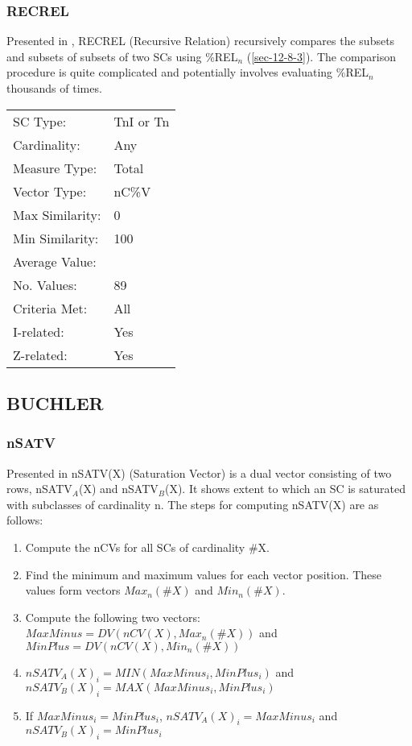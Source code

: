 \documentclass{article}
\begin{document}
\subsubsection{RECREL}
\label{sec-12-8-5}

Presented in \citet{Castren1994}, RECREL (Recursive Relation)
recursively compares the subsets and subsets of subsets of two SCs
using \%REL$_{n}$ (\ref{sec-12-8-3}). The comparison procedure is quite
complicated and potentially involves evaluating \%REL$_{n}$ thousands of
times.

\begin{center}
\begin{tabular}{ll}
 SC Type:         &  TnI or Tn  \\
 Cardinality:     &  Any        \\
 Measure Type:    &  Total      \\
 Vector Type:     &  nC\%V      \\
 Max Similarity:  &  0          \\
 Min Similarity:  &  100        \\
 Average Value:   &             \\
 No. Values:      &  89         \\
 Criteria Met:    &  All        \\
 I-related:       &  Yes        \\
 Z-related:       &  Yes        \\
\end{tabular}
\end{center}
\subsection{BUCHLER}
\label{sec-12-9}
\subsubsection{nSATV}
\label{sec-12-9-1}

Presented in \citet[chap. 2.3]{Buchler1997} nSATV(X) (Saturation
Vector) is a dual vector consisting of two rows, nSATV$_{A}$(X) and
nSATV$_{B}$(X). It shows extent to which an SC is saturated with
subclasses of cardinality n. The steps for computing nSATV(X) are
as follows:

\begin{enumerate}
\item Compute the nCVs for all SCs of cardinality \#X.
\item Find the minimum and maximum values for each vector position. These
   values form vectors $Max_{n}(\#X)$ and $Min_{n}(\#X)$.
\item Compute the following two vectors:
   $MaxMinus=DV(nCV(X),Max_{n}(\#X))$ and $MinPlus=DV(nCV(X),Min_{n}(\#X))$
\item $nSATV_{A}(X)_{i}=MIN(MaxMinus_{i},MinPlus_{i})$ and
   $nSATV_{B}(X)_{i}=MAX(MaxMinus_{i},MinPlus_{i})$
\item If $MaxMinus_{i}=MinPlus_{i}$, $nSATV_{A}(X)_{i}=MaxMinus_{i}$
   and $nSATV_{B}(X)_{i}=MinPlus_{i}$
\end{enumerate}
\end{document}
